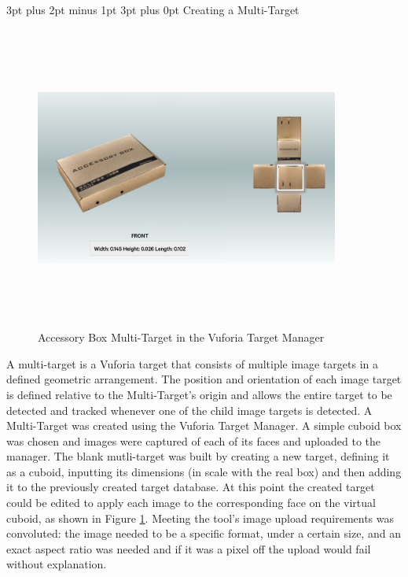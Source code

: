 \documentclass[12pt,a4paper,oneside]{article}
\makeatletter
\renewcommand\paragraph{\@startsection {paragraph}{1}{0mm} %
	                           {3pt plus 2pt minus 1pt} %
	                           {3pt plus 0pt} %
	                           {\normalfont}}
\makeatother
\begin{document}
\paragraph{Creating a Multi-Target}
\begin{figure}[!h]
	\centering
	\includegraphics[width=10cm,height=10cm,keepaspectratio]{images/accessorybox}
	\caption[Accessory Box Multi-Target]{Accessory Box Multi-Target in the Vuforia Target Manager}
	\label{fig_accessorybox}
\end{figure}

A multi-target is a Vuforia target that consists of multiple image targets in a defined geometric arrangement. The position and orientation of each image target is defined relative to the Multi-Target's origin and allows the entire target to be detected and tracked whenever one of the child image targets is detected. A Multi-Target was created using the Vuforia Target Manager. A simple cuboid box was chosen and images were captured of each of its faces and uploaded to the manager. The blank mutli-target was built by creating a new target, defining it as a cuboid, inputting its dimensions (in scale with the real box) and then adding it to the previously created target database. At this point the created target could be edited to apply each image to the corresponding face on the virtual cuboid, as shown in Figure \ref{fig_accessorybox}. Meeting the tool's image upload requirements was convoluted: the image needed to be a specific format, under a certain size, and an exact aspect ratio was needed and if it was a pixel off the upload would fail without explanation. 
\end{document}
